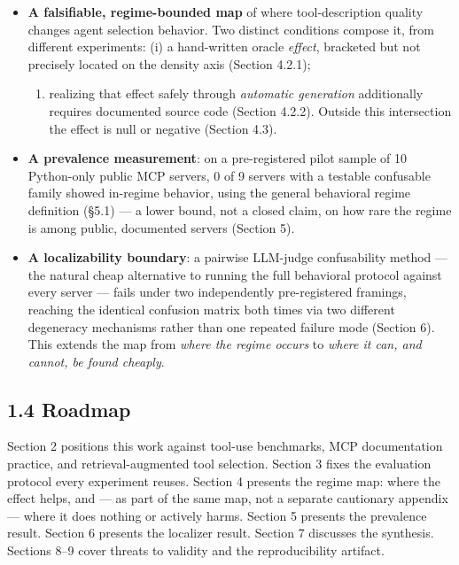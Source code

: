 \begin{itemize}
\tightlist
\item
  \textbf{A falsifiable, regime-bounded map} of where tool-description
  quality changes agent selection behavior. Two distinct conditions
  compose it, from different experiments: (i) a hand-written oracle
  \emph{effect}, bracketed but not precisely located on the density axis
  (Section 4.2.1);

  \begin{enumerate}
  \def\labelenumi{(\roman{enumi})}
  \setcounter{enumi}{1}
  \tightlist
  \item
    realizing that effect safely through \emph{automatic generation}
    additionally requires documented source code (Section 4.2.2).
    Outside this intersection the effect is null or negative (Section
    4.3).
  \end{enumerate}
\item
  \textbf{A prevalence measurement}: on a pre-registered pilot sample of
  10 Python-only public MCP servers, 0 of 9 servers with a testable
  confusable family showed in-regime behavior, using the general
  behavioral regime definition (§5.1) --- a lower bound, not a closed
  claim, on how rare the regime is among public, documented servers
  (Section 5).
\item
  \textbf{A localizability boundary}: a pairwise LLM-judge confusability
  method --- the natural cheap alternative to running the full
  behavioral protocol against every server --- fails under two
  independently pre-registered framings, reaching the identical
  confusion matrix both times via two different degeneracy mechanisms
  rather than one repeated failure mode (Section 6). This extends the
  map from \emph{where the regime occurs} to \emph{where it can, and
  cannot, be found cheaply}.
\end{itemize}

\hypertarget{roadmap}{%
\subsection{1.4 Roadmap}\label{roadmap}}

Section 2 positions this work against tool-use benchmarks, MCP
documentation practice, and retrieval-augmented tool selection. Section
3 fixes the evaluation protocol every experiment reuses. Section 4
presents the regime map: where the effect helps, and --- as part of the
same map, not a separate cautionary appendix --- where it does nothing
or actively harms. Section 5 presents the prevalence result. Section 6
presents the localizer result. Section 7 discusses the synthesis.
Sections 8--9 cover threats to validity and the reproducibility
artifact.

